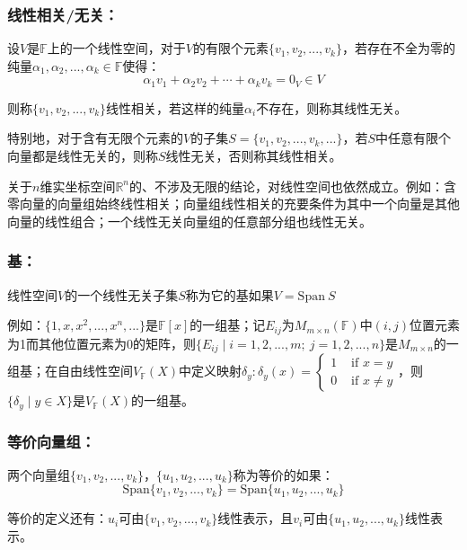 \documentclass[zihao=-4,UTF8]{report}
\theoremstyle{mystyle} %
\begin{document}
\subsubsection{线性相关/无关：}
设$V$是$\mathbb{F}$上的一个线性空间，对于$V$的有限个元素$\{v_1,v_2,...,v_k\}$，若存在不全为零的纯量$\alpha_1,\alpha_2,...,\alpha_k \in \mathbb{F}$使得：
\begin{equation*}
    \alpha_1v_1+\alpha_2v_2+\cdots+\alpha_kv_k=0_V \in V
\end{equation*}\par
则称$\{v_1,v_2,...,v_k\}$线性相关，若这样的纯量$\alpha_i$不存在，则称其线性无关。\par
特别地，对于含有无限个元素的$V$的子集$S = \{v_1,v_2,...,v_k,...\}$，若$S$中任意有限个向量都是线性无关的，则称$S$线性无关，否则称其线性相关。\par
{\color{gray}\small 
关于$n$维实坐标空间$\mathbb{R}^n$的、不涉及无限的结论，对线性空间也依然成立。例如：含零向量的向量组始终线性相关；向量组线性相关的充要条件为其中一个向量是其他向量的线性组合；一个线性无关向量组的任意部分组也线性无关。
}

\subsubsection{基：}
线性空间$V$的一个线性无关子集$S$称为它的基如果$V = \text{Span}\ S$\par
{\color{gray}\small 
例如：$\{1,x,x^2,...,x^n,...\}$是$\mathbb{F}[x]$的一组基；记$E_{ij}$为$M_{m\times n}(\mathbb{F})$中$(i,j)$位置元素为1而其他位置元素为0的矩阵，则$\{E_{ij}\mid i = 1,2,...,m;\ j = 1,2,...,n\}$是$M_{m\times n}$的一组基；在自由线性空间$V_{\mathbb{F}}(X)$中定义映射$\delta_y:\delta_y(x) = \begin{cases}
    1 & \text{ if } x= y\\
    0 & \text{ if } x\ne y
   \end{cases}$，则$\{\delta_y\mid y\in X \}$是$V_{\mathbb{F}}(X)$的一组基。
}

\subsubsection{等价向量组：}
两个向量组$\{v_1,v_2,...,v_k\}$，$\{u_1,u_2,...,u_k\}$称为等价的如果：
\begin{equation*}
    \text{Span} \{v_1,v_2,...,v_k\} = \text{Span} \{u_1,u_2,...,u_k\}
\end{equation*}\par
等价的定义还有：$u_i$可由$\{v_1,v_2,...,v_k\}$线性表示，且$v_i$可由$\{u_1,u_2,...,u_k\}$线性表示。
\end{document}
